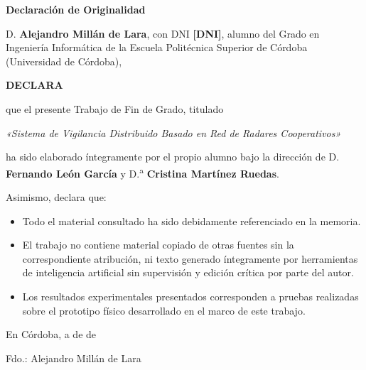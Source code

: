 \thispagestyle{empty}

\vspace*{1cm}

\begin{center}
    {\Large \textbf{Declaración de Originalidad}}
\end{center}

\vspace{1cm}

D. \textbf{Alejandro Millán de Lara}, con DNI \textbf{[DNI]}, alumno del Grado en
Ingeniería Informática de la Escuela Politécnica Superior de Córdoba (Universidad de
Córdoba),

\vspace{0.8em}

\textbf{DECLARA}

\vspace{0.8em}

que el presente Trabajo de Fin de Grado, titulado

\vspace{0.4em}

\begin{center}
    \textit{«Sistema de Vigilancia Distribuido Basado en Red de Radares Cooperativos»}
\end{center}

\vspace{0.4em}

ha sido elaborado íntegramente por el propio alumno bajo la dirección de
D. \textbf{Fernando León García} y D.\textsuperscript{a} \textbf{Cristina Martínez Ruedas}.

\vspace{0.8em}

Asimismo, declara que:

\begin{itemize}
    \item Todo el material consultado ha sido debidamente referenciado en la memoria.
    \item El trabajo no contiene material copiado de otras fuentes sin la correspondiente
          atribución, ni texto generado íntegramente por herramientas de inteligencia
          artificial sin supervisión y edición crítica por parte del autor.
    \item Los resultados experimentales presentados corresponden a pruebas realizadas
          sobre el prototipo físico desarrollado en el marco de este trabajo.
\end{itemize}

\vfill

En Córdoba, a \hspace{1cm} de \hspace{2.5cm} de \the\year

\vspace{1.5cm}

\begin{flushright}
    \begin{minipage}{0.45\textwidth}
        \centering
        Fdo.: Alejandro Millán de Lara
    \end{minipage}
\end{flushright}

\clearpage
